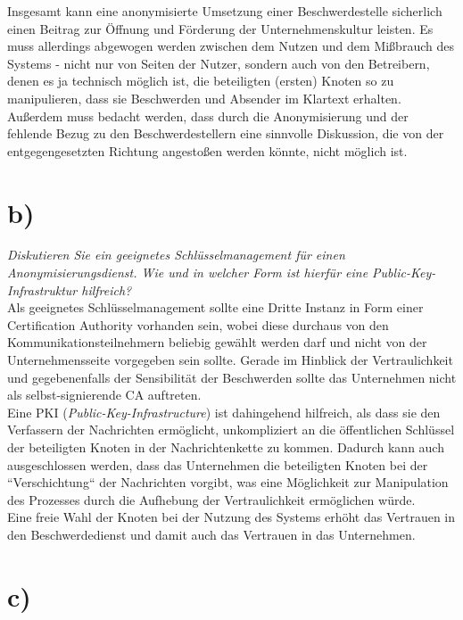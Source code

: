\noindent
Insgesamt kann eine anonymisierte Umsetzung einer Beschwerdestelle sicherlich einen Beitrag zur Öffnung und Förderung der Unternehmenskultur leisten.
Es muss allerdings abgewogen werden zwischen dem Nutzen und dem Mißbrauch des Systems - nicht nur von Seiten der Nutzer, sondern auch von den Betreibern, denen es ja technisch möglich ist, die beteiligten (ersten) Knoten so zu manipulieren, dass sie Beschwerden und Absender im Klartext erhalten.\\
Außerdem muss bedacht werden, dass durch die Anonymisierung und der fehlende Bezug zu den Beschwerdestellern eine sinnvolle Diskussion, die von der entgegengesetzten Richtung angestoßen werden könnte, nicht möglich ist.


\section{b)}
\textit{Diskutieren Sie ein geeignetes Schlüsselmanagement für einen Anonymisierungsdienst. Wie und in welcher Form ist hierfür eine Public-Key-Infrastruktur hilfreich?}\\

\noindent
Als geeignetes Schlüsselmanagement sollte eine Dritte Instanz in Form einer Certification Authority vorhanden sein, wobei diese durchaus von den Kommunikationsteilnehmern beliebig gewählt werden darf und nicht von der Unternehmensseite vorgegeben sein sollte.
Gerade im Hinblick der Vertraulichkeit und gegebenenfalls der Sensibilität der Beschwerden sollte das Unternehmen nicht als selbst-signierende CA auftreten.\\

\noindent
Eine PKI (\textit{Public-Key-Infrastructure}) ist dahingehend hilfreich, als dass sie den Verfassern der Nachrichten ermöglicht, unkompliziert an die öffentlichen Schlüssel der beteiligten Knoten in der Nachrichtenkette zu kommen.
Dadurch kann auch ausgeschlossen werden, dass das Unternehmen die beteiligten Knoten bei der ``Verschichtung`` der Nachrichten vorgibt, was eine Möglichkeit zur Manipulation des Prozesses durch die Aufhebung der Vertraulichkeit ermöglichen würde.\\
Eine freie Wahl der Knoten bei der Nutzung des Systems erhöht das Vertrauen in den Beschwerdedienst und damit auch das Vertrauen in das Unternehmen.


\section{c)}

